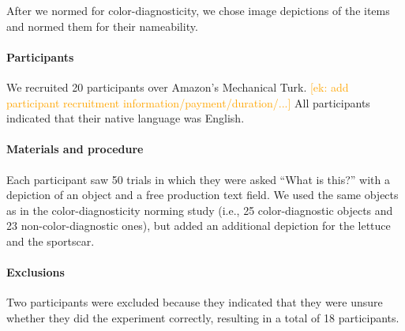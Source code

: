 \documentclass[a4paper,man,floatsintext,natbib,donotrepeattitle]{apa6}
\newcommand{\ek}[1]{\textcolor{Orange}{[ek: #1]}}
\begin{document}





After we normed for color-diagnosticity, we chose image depictions of the items and normed them for their nameability. 

\paragraph{Participants}
We recruited 20 participants over Amazon's Mechanical Turk. \ek{add participant recruitment information/payment/duration/...} All participants indicated that their native language was English.

\paragraph{Materials and procedure}
Each participant saw 50 trials in which they were asked ``What is this?'' with a depiction of an object and a free production text field.
We used the same objects as in the color-diagnosticity norming study (i.e., 25 color-diagnostic objects and 23 non-color-diagnostic ones), but added an additional depiction for the lettuce and the sportscar.

\paragraph{Exclusions}
Two participants were excluded because they indicated that they were unsure whether they did the experiment correctly, resulting in a total of 18 participants.
\end{document}
